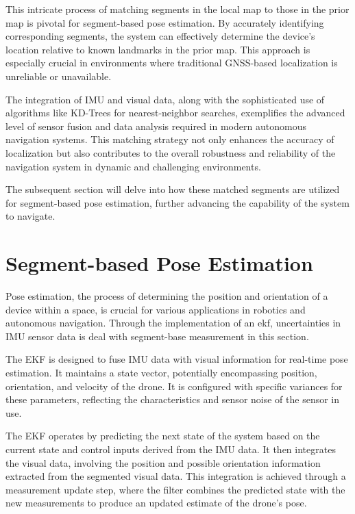 This intricate process of matching segments in the local map to those in the prior map is pivotal for segment-based pose estimation. By accurately identifying corresponding segments, the system can effectively determine the device's location relative to known landmarks in the prior map. This approach is especially crucial in environments where traditional GNSS-based localization is unreliable or unavailable.

The integration of IMU and visual data, along with the sophisticated use of algorithms like KD-Trees for nearest-neighbor searches, exemplifies the advanced level of sensor fusion and data analysis required in modern autonomous navigation systems. This matching strategy not only enhances the accuracy of localization but also contributes to the overall robustness and reliability of the navigation system in dynamic and challenging environments.

The subsequent section will delve into how these matched segments are utilized for segment-based pose estimation, further advancing the capability of the system to navigate.

\section{Segment-based Pose Estimation}

Pose estimation, the process of determining the position and orientation of a device within a space, is crucial for various applications in robotics and autonomous navigation. Through the implementation of an \acrlong{ekf}, uncertainties in IMU sensor data is deal with segment-base measurement in this section.

The EKF is designed to fuse IMU data with visual information for real-time pose estimation. It maintains a state vector, potentially encompassing position, orientation, and velocity of the drone. It is configured with specific variances for these parameters, reflecting the characteristics and sensor noise of the sensor in use.

The EKF operates by predicting the next state of the system based on the current state and control inputs derived from the IMU data. It then integrates the visual data, involving the position and possible orientation information extracted from the segmented visual data. This integration is achieved through a measurement update step, where the filter combines the predicted state with the new measurements to produce an updated estimate of the drone's pose.

